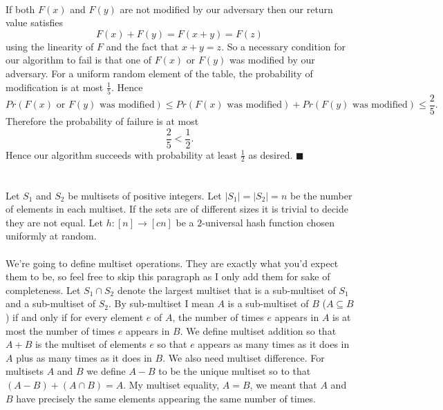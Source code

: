 \documentclass[letterpaper,12pt,oneside,onecolumn]{article}
\begin{document}
\paragraph{}
If both $F(x)$ and $F(y)$ are not modified by our adversary then our return value satisfies
$$F(x) + F(y) = F(x+y) = F(z)$$
using the linearity of $F$ and the fact that $x+y = z$. So a necessary condition for our algorithm to fail is that one of $F(x)$ or $F(y)$ was modified by our adversary. For a uniform random element of the table, the probability of modification is at most $\frac{1}{5}$. Hence
$$Pr(F(x)\text{ or } F(y)\text{ was modified}) \leq Pr(F(x) \text{ was modified}) + Pr(F(y)\text{ was modified}) \leq \frac{2}{5}.$$
Therefore the probability of failure is at most
$$\frac{2}{5} < \frac{1}{2}.$$
Hence our algorithm succeeds with probability at least $\frac{1}{2}$ as desired. $\blacksquare$

\newpage
\section{}
\paragraph{}
Let $S_1$ and $S_2$ be multisets of positive integers. Let $|S_1| = |S_2| = n$ be the number of elements in each multiset. If the sets are of different sizes it is trivial to decide they are not equal. Let $h:[n] \rightarrow [cn]$ be a $2$-universal hash function chosen uniformly at random.
\paragraph{}
We're going to define multiset operations. They are exactly what you'd expect them to be, so feel free to skip this paragraph as I only add them for sake of completeness. Let $S_1\cap S_2$ denote the largest multiset that is a sub-multiset of $S_1$ and a sub-multiset of $S_2$. By sub-multiset I mean $A$ is a sub-multiset of $B$ ($A\subseteq B$) if and only if for every element $e$ of $A$, the number of times $e$ appears in $A$ is at most the number of times $e$ appears in $B$. We define multiset addition so that $A+B$ is the multiset of elements $e$ so that $e$ appears as many times as it does in $A$ plus as many times as it does in $B$. We also need multiset difference. For multisets $A$ and $B$ we define $A-B$ to be the unique multiset so to that $(A-B) + (A\cap B) = A$. My multiset equality, $A=B$, we meant that $A$ and $B$ have precisely the same elements appearing the same number of times.
\end{document}
